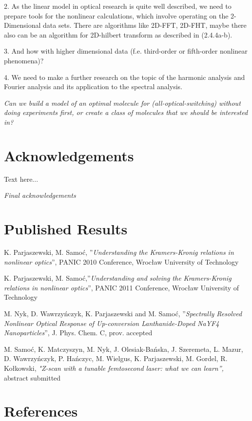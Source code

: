 \documentclass[12pt,twoside,a4paper]{article}
\def\emptyline{\vspace{12pt}}
\numberwithin{equation}{subsection}
\numberwithin{figure}{subsection}
\begin{document}
2. As the linear model in optical research is quite well described, we need to prepare tools for the nonlinear calculations, which
involve operating on the 2-Dimensional data sets. There are algorithms like 2D-FFT, 2D-FHT, maybe there also can be an algorithm
for 2D-hilbert transform as described in (2.4.4a-b). 

3. And how with higher dimensional data (f.e. third-order or fifth-order nonlinear phenomena)?

4. We need to make a further research on the topic of the harmonic analysis and Fourier analysis and its application to the
spectral analysis.

\textit{Can we build a model of an optimal molecule for (all-optical-switching) without doing experiments first, or create a class
of molecules that we should be interested in?}

\section{Acknowledgements} \label{chap:acknowledgements}

Text here... 

\textit{Final acknowledgements}

\section{Published Results} \label{chap:published_results}

K. Parjaszewski, M. Samoć, ''\textit{Understanding the Kramers-Kronig
relations in nonlinear optics}'', PANIC 2010 Conference, Wrocław
University of Technology

\emptyline

K. Parjaszewski, M. Samoć,''\textit{Understanding and solving the
Kramers-Kronig relations in nonlinear optics}'', PANIC 2011 Conference,
Wrocław University of Technology

\emptyline

M. Nyk, D. Wawrzyńczyk, K. Parjaszewski and M. Samoć,
''\textit{Spectrally Resolved Nonlinear Optical Response of
Up-conversion Lanthanide-Doped NaYF4 Nanoparticles}'', J. Phys. Chem.
C, prov. accepted 

\emptyline

M. Samoć, K. Matczyszyn, M. Nyk, J. Olesiak-Bańska, J. Szeremeta, L.
Mazur, D. Wawrzyńczyk, P. Hańczyc, M. Wielgus, K. Parjaszewski, M.
Gordel, R. Kołkowski, \textit{"Z-scan with a tunable femtosecond
laser: what we can learn'', }abstract submitted


\section{References}
\nocite{*}


\end{document}
